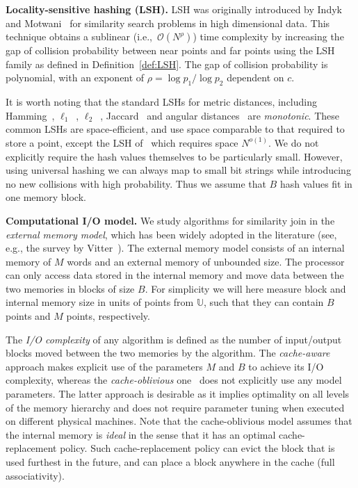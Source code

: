 \documentclass{llncs}
\newcommand{\Osymbol}{{\mathcal O}}
\newcommand{\BO}[1]{\Osymbol\left(#1\right)}
\begin{document}
\smallskip

\textbf{Locality-sensitive hashing (LSH).}
LSH was originally introduced by Indyk and Motwani~\cite{Indyk_STOC98} for
similarity search problems in high dimensional data. 
This technique obtains a sublinear (i.e.,~$\BO{N^{\rho}}$) time complexity by increasing the gap of collision probability between near points and far points using the LSH family as defined in Definition~\ref{def:LSH}. 
The gap of collision probability is polynomial, with an exponent of $\rho = \log{p_1}/\log{p_2}$ dependent on $c$.  

It is worth noting that the standard LSHs for metric distances, including Hamming~\cite{Indyk_STOC98}, $\ell_1$~\cite{Datar_SOCG04}, $\ell_2$~\cite{Andoni_FOCS06,Datar_SOCG04}, Jaccard~\cite{Broder_NETWORK97} and angular distances~\cite{Charikar_STOC02} are \textit{monotonic}. 
These common LSHs are space-efficient, and use space comparable to that required to store a point, except the LSH of~\cite{Andoni_FOCS06} which requires space $N^{o(1)}$.
We do not explicitly require the hash values themselves to be particularly small.
However, using universal hashing we can always map to small bit strings while introducing no new collisions with high probability. 
Thus we assume that $B$ hash values fit in one memory block.








\smallskip

\textbf{Computational I/O model.}
We study algorithms for similarity join in the \emph{external memory model}, which has been widely adopted in the literature (see, e.g., the survey by
Vitter~\cite{Vitter08}).
The external memory model consists of an internal memory of $M$ words and an external memory of unbounded size. 
The processor can only access data stored in the internal memory and move data between the two memories in blocks of size $B$.
For simplicity we will here measure block and internal memory size in units of points from $\mathbb{U}$, such that they can contain $B$ points and $M$ points, respectively.

The \emph{I/O complexity} of any algorithm is defined as the number of input/output blocks moved between the two memories by the algorithm. 
The \emph{cache-aware} approach makes explicit use of the parameters $M$ and $B$  to achieve its I/O complexity, whereas the \textit{cache-oblivious} one~\cite{frigo1999cache} does not explicitly use any model parameters. 
The latter approach is desirable as it implies optimality on all levels of the memory hierarchy and does not require parameter tuning when executed on different physical machines. 
Note that the cache-oblivious model assumes that the internal memory is \emph{ideal} in the sense that it has an optimal cache-replacement policy. Such cache-replacement policy can evict the block that is used furthest in the future, and can place a block anywhere in the cache (full associativity). 
\end{document}
